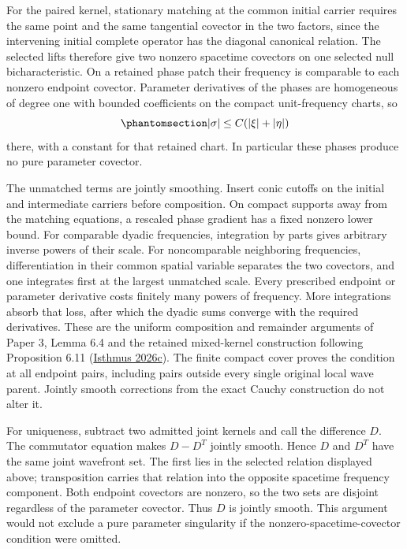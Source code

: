 \documentclass[
  english,
  11pt,
  reqno]{amsart}
\begin{document}
For the paired kernel, stationary matching at the common initial carrier
requires the same point and the same tangential covector in the two
factors, since the intervening initial complete operator has the
diagonal canonical relation. The selected lifts therefore give two
nonzero spacetime covectors on one selected null bicharacteristic. On a
retained phase patch their frequency is comparable to each nonzero
endpoint covector. Parameter derivatives of the phases are homogeneous
of degree one with bounded coefficients on the compact unit-frequency
charts, so
\begin{equation}\protect\phantomsection\label{eq:family-parameter-frequency-control}{
|\sigma|\le C(|\xi|+|\eta|)
}\end{equation} there, with a constant for that retained chart. In
particular these phases produce no pure parameter covector.

The unmatched terms are jointly smoothing. Insert conic cutoffs on the
initial and intermediate carriers before composition. On compact
supports away from the matching equations, a rescaled phase gradient has
a fixed nonzero lower bound. For comparable dyadic frequencies,
integration by parts gives arbitrary inverse powers of their scale. For
noncomparable neighboring frequencies, differentiation in their common
spatial variable separates the two covectors, and one integrates first
at the largest unmatched scale. Every prescribed endpoint or parameter
derivative costs finitely many powers of frequency. More integrations
absorb that loss, after which the dyadic sums converge with the required
derivatives. These are the uniform composition and remainder arguments
of Paper 3, Lemma 6.4 and the retained mixed-kernel construction
following Proposition 6.11 (\hyperref[ref-IsthmusSmooth2026]{Isthmus
2026c}). The finite compact cover proves the condition at all endpoint
pairs, including pairs outside every single original local wave parent.
Jointly smooth corrections from the exact Cauchy construction do not
alter it.

For uniqueness, subtract two admitted joint kernels and call the
difference \(D\). The commutator equation makes \(D-D^T\) jointly
smooth. Hence \(D\) and \(D^T\) have the same joint wavefront set. The
first lies in the selected relation displayed above; transposition
carries that relation into the opposite spacetime frequency component.
Both endpoint covectors are nonzero, so the two sets are disjoint
regardless of the parameter covector. Thus \(D\) is jointly smooth. This
argument would not exclude a pure parameter singularity if the
nonzero-spacetime-covector condition were omitted.
\end{document}
